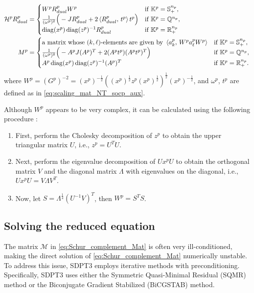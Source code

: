 \begin{align}
    \mathcal{H}^p R^p_{dual} &= \begin{cases}
        W^p R^p_{dual} W^p & \text{if } \mathbb{K}^p = \mathbb{S}^{n_p}_+, \\
        \frac{1}{(\omega^p)^2} \Big(-J R^p_{dual} + 2\left\langle R^p_{dual}, \, t^p \right\rangle t^p\Big) & \text{if } \mathbb{K}^p = \mathbb{Q}^{n_p},\\
        \operatorname{diag}(x^p) \operatorname{diag}(z^p)^{-1} R^p_{dual} & \text{if } \mathbb{K}^p = \mathbb{R}^{n_p}_+
    \end{cases}\\
    M^p &= \begin{cases}
        \text{a matrix whose $(k,\ell)$-elements are given by } \left\langle a^p_k, \, W^p a^p_\ell W^p \right\rangle & \text{if } \mathbb{K}^p = \mathbb{S}^{n_p}_+,\\
        \frac{1}{(\omega^p)^2}\Big(-A^p J (A^p)^T + 2 (A^p t^p)(A^p t^p)^T \Big) & \text{if } \mathbb{K}^p = \mathbb{Q}^{n_p}, \\
        A^p \operatorname{diag}(x^p) \operatorname{diag}(z^p)^{-1} (A^p)^T & \text{if } \mathbb{K}^p = \mathbb{R}^{n_p}_+.
    \end{cases} \label{eq:NT_M}
\end{align}
where $W^p = (G^p)^{-2} = (x^p)^{-\frac{1}{2}}((x^p)^{\frac{1}{2}} z^p (x^p)^{\frac{1}{2}})^{\frac{1}{2}} (x^p)^{-\frac{1}{2}}$, and $\omega^p$, $t^p$ are defined as in \eqref{eq:scaling_mat_NT_socp_aux}.

Although $W^p$ appears to be very complex, it can be calculated using the following procedure \cite{todd1998}:
\begin{enumerate}
    \item First, perform the Cholesky decomposition of $z^p$ to obtain the upper triangular matrix $U$, i.e., $z^p=U^TU$.
    \item Next, perform the eigenvalue decomposition of $U x^p U$ to obtain the orthogonal matrix $V$ and the diagonal matrix $\Lambda$ with eigenvalues on the diagonal, i.e., $U x^p U = V \Lambda V^T$.
    \item Now, let $S=\Lambda^\frac{1}{4}(U^{-1}V)^T$, then $W^p=S^T S$.
\end{enumerate}


\subsection{Solving the reduced equation}
The matrix $\mathcal{M}$ in \eqref{eq:Schur_complement_Mat} is often very ill-conditioned, making the direct solution of \eqref{eq:Schur_complement_Mat} numerically unstable. 
To address this issue, SDPT3 employs iterative methods with preconditioning. 
Specifically, SDPT3 \cite{toh1999} uses either the Symmetric Quasi-Minimal Residual (SQMR) method \cite{Freund1994} or the Biconjugate Gradient Stabilized (BiCGSTAB) method.

